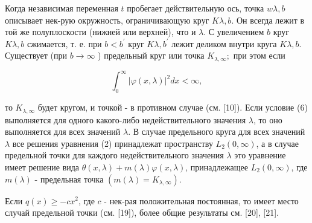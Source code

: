 \documentclass[10pt]{article}
\begin{document}
Когда независимая переменная $t$ пробегает действительную ось, точка $w \lambda, b$ описывает нек-рую окружность, ограничивающую круг $K \lambda, b$. Он всегда лежит в той же полуплоскости (нижней или верхней), что и $\lambda$. С увеличением $b$ круг $K \lambda, b$ сжимается, т. е. при $b<b^{\prime}$ круг $K \lambda, b^{\prime}$ лежит деликом внутри круга $K \lambda, b$. Существует (при $b \rightarrow \infty$ ) предельный круг или точка $K_{\lambda, \infty} ;$ при этом если



\[

\int_{0}^{\infty}|\varphi(x, \lambda)|^{2} d x<\infty,

\]



то $K_{\lambda, \infty}$ будет кругом, и точкой - в противном случае (см. [10]). Если условие (6) выполняется для одного какого-либо недействительного значения $\lambda$, то оно выполняется для всех значений $\lambda$. В случае предельного круга для всех значений $\lambda$ все решения уравнения (2) принадлежат пространству $L_{2}(0, \infty)$, а в случае предельной точки для каждого недействительного значения $\lambda$ это уравнение имеет решение вида $\theta(x, \lambda)+m(\lambda) \varphi(x, \lambda)$, принадлежащее $L_{2}(0, \infty)$, где $m(\lambda)$ - предельная точка $\left(m(\lambda)=K_{\lambda, \infty}\right)$.



Если $q(x) \geqslant-c x^{2}$, где $c$ - нек-рая положительная постоянная, то имеет место случай предельной точки (см. [19]), более общие результаты см. [20], [21].
\end{document}
